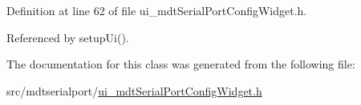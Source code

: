 Definition at line 62 of file ui\-\_\-mdt\-Serial\-Port\-Config\-Widget.\-h.



Referenced by setup\-Ui().



The documentation for this class was generated from the following file\-:\begin{DoxyCompactItemize}
\item 
src/mdtserialport/\hyperlink{ui__mdt_serial_port_config_widget_8h}{ui\-\_\-mdt\-Serial\-Port\-Config\-Widget.\-h}\end{DoxyCompactItemize}
